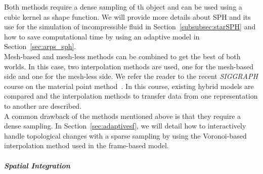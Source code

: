Both methods require a dense sampling of th object and can be used using a cubic kernel as shape function. We will provide more details about SPH and its use for the simulation of incompressible fluid in Section~\ref{subsubsec:starSPH} and how to save computational time by using an adaptive model in Section~\ref{sec:arps_sph}.
\\
Mesh-based and mesh-less methods can be combined to get the best of both worlds.
In this case, two interpolation methods are used, one for the mesh-based side and one for the mesh-less side.
We refer the reader to the recent \emph{SIGGRAPH} course on the material point method~\cite{Jiang2016}.
In this course, existing hybrid models are compared and the interpolation methods to transfer data from one representation  to another are described.
\\
A common drawback of the methods mentioned above is that they require a dense sampling. In Section~\ref{sec:adaptivesf}, we will detail how to interactively handle topological changes with a sparse sampling by using the Voronoi-based interpolation method used in the frame-based model.

\subparagraph{Spatial Integration}

